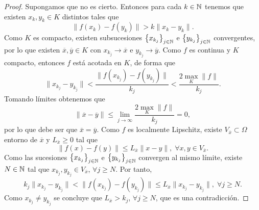 \begin{proof}
Supongamos que no es cierto. Entonces para cada $\displaystyle k \in \mathbb{N} $ tenemos que existen $\displaystyle x_{k}, y_{k}\in K $ distintos tales que 
\[ \|f\left(x_{k}\right)-f\left(y_{k}\right)\| > k \|x_{k}-y_{k}\| .\]
Como $\displaystyle K $ es compacto, existen subsucesiones $\displaystyle \left\{ x_{k_{j}}\right\} _{j \in \mathbb{N}} $ e $\displaystyle \left\{ y_{k_{j}}\right\} _{j \in \mathbb{N}} $ convergentes, por lo que existen $\displaystyle \overline{x}, \overline{y}\in K $ con $\displaystyle x_{k_{j}}\to \overline{x} $ e $\displaystyle y_{k_{j}}\to \overline{y} $. 
Como $\displaystyle f $ es continua y $\displaystyle K $ compacto, entonces $\displaystyle f $ está acotada en $\displaystyle K $, de forma que 
\[\|x_{k_{j}}-y_{k_{j}}\|< \frac{\|f\left(x_{k_{j}}\right)-f\left(y_{k_{j}}\right)\|}{k_{j}}<\frac{2\max_{K} \|f\|}{k_{j}} .\]
Tomando límites obtenemos que 
\[\|\overline{x}-\overline{y}\| \leq \lim_{j \to \infty}\frac{2\max_{K} \|f\|}{k_{j}} = 0 ,\]
por lo que debe ser que $\displaystyle \overline{x}=\overline{y} $. Como $\displaystyle f $ es localmente Lipschitz, existe $\displaystyle V_{\overline{x}}\subset \Omega  $ entorno de $\displaystyle \overline{x} $ y $\displaystyle L_{\overline{x}} \geq 0$ tal que
\[\|f\left(x\right)-f\left(y\right)\|\leq L_{\overline{x}}\|x-y\|, \; \forall x,y\in V_{\overline{x}} .\]
Como las sucesiones $\displaystyle \left\{ x_{k_{j}}\right\} _{j \in \mathbb{N}} $ e $\displaystyle \left\{ y_{k_{j}}\right\} _{j \in \mathbb{N}} $ convergen al mismo límite, existe $\displaystyle N \in \mathbb{N} $ tal que $\displaystyle x_{k_{j}}, y_{k_{j}} \in V_{\overline{x}} $, $\displaystyle \forall j \geq N $. 
Por tanto,
\[k_{j}\|x_{k_{j}}-y_{k_{j}}\| < \|f\left(x_{k_{j}}\right)-f\left(y_{k_{j}}\right)\| \leq L_{\overline{x}}\|x_{k_{j}}-y_{k_{j}}\|, \; \forall j \geq N .\]
Como $\displaystyle x_{k_{j}}\neq y_{k_{j}} $ se concluye que $\displaystyle L_{\overline{x}}>k_{j} $, $\displaystyle \forall j \geq N $, que es una contradicción. 
\end{proof}

